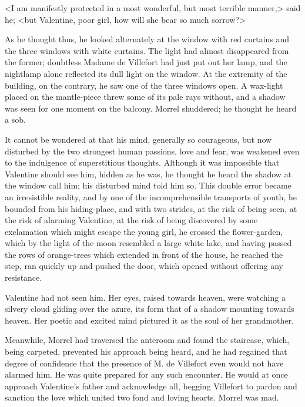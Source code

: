  <I am manifestly protected in a most wonderful, but most terrible manner,> said he; <but Valentine, poor girl, how will she bear so much sorrow?> 

 As he thought thus, he looked alternately at the window with red curtains and the three windows with white curtains. The light had almost disappeared from the former; doubtless Madame de Villefort had just put out her lamp, and the nightlamp alone reflected its dull light on the window. At the extremity of the building, on the contrary, he saw one of the three windows open. A wax-light placed on the mantle-piece threw some of its pale rays without, and a shadow was seen for one moment on the balcony. Morrel shuddered; he thought he heard a sob. 

 It cannot be wondered at that his mind, generally so courageous, but now disturbed by the two strongest human passions, love and fear, was weakened even to the indulgence of superstitious thoughts. Although it was impossible that Valentine should see him, hidden as he was, he thought he heard the shadow at the window call him; his disturbed mind told him so. This double error became an irresistible reality, and by one of the incomprehensible transports of youth, he bounded from his hiding-place, and with two strides, at the risk of being seen, at the risk of alarming Valentine, at the risk of being discovered by some exclamation which might escape the young girl, he crossed the flower-garden, which by the light of the moon resembled a large white lake, and having passed the rows of orange-trees which extended in front of the house, he reached the step, ran quickly up and pushed the door, which opened without offering any resistance. 

 Valentine had not seen him. Her eyes, raised towards heaven, were watching a silvery cloud gliding over the azure, its form that of a shadow mounting towards heaven. Her poetic and excited mind pictured it as the soul of her grandmother. 

 Meanwhile, Morrel had traversed the anteroom and found the staircase, which, being carpeted, prevented his approach being heard, and he had regained that degree of confidence that the presence of M. de Villefort even would not have alarmed him. He was quite prepared for any such encounter. He would at once approach Valentine's father and acknowledge all, begging Villefort to pardon and sanction the love which united two fond and loving hearts. Morrel was mad. 

